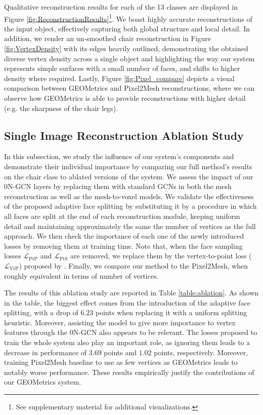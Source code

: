 \documentclass{article}
\begin{document}
Qualitative reconstruction results for each of the 13 classes are displayed in Figure \ref{fig:ReconstructionResults}\footnote{See supplementary material for additional visualizations.}. We boast highly accurate reconstructions of the input object, effectively capturing both global structure and local detail. In addition, we render an un-smoothed chair reconstruction in Figure \ref{fig:VertexDensity} with its edges heavily outlined, demonstrating the obtained diverse vertex density across a single object and highlighting the way our system represents simple surfaces with a small number of faces, and shifts to higher density where required. Lastly, Figure \ref{fig:Pixel_compare} depicts a visual comparison between GEOMetrics and Pixel2Mesh reconstructions, where we can observe how GEOMetrics is able to provide reconstructions with higher detail (e.g. the sharpness of the chair legs). 


\subsection{Single Image Reconstruction Ablation Study}

In this subsection, we study the influence of our system's components and demonstrate their individual importance by comparing our full method's results on the chair class to ablated versions of the system. We assess the impact of our 0N-GCN layers by replacing them with standard GCNs \cite{GCN} in both the mesh reconstruction as well as the mesh-to-voxel models. We validate the effectiveness of the proposed adaptive face splitting by substituting it by a procedure in which all faces are split at the end of each reconstruction module, keeping uniform detail and maintaining approximately the same the number of vertices as the full approach. We then check the importance of each one of the newly introduced losses by removing them at training time. Note that, when the face sampling losses $\mathcal{L}_{\text{PtP}}$ and $\mathcal{L}_{\text{PtS}}$ are removed, we replace them by the vertex-to-point loss ($\mathcal{L}_{\text{VtP}}$) proposed by \citet{Pixel2Mesh}. Finally, we compare our method to the Pixel2Mesh, when roughly equivalent in terms of number of vertices.

The results of this ablation study are reported in Table \ref{table:ablation}. As shown in the table, the biggest effect comes from the introduction of the adaptive face splitting, with a drop of $6.23$ points when replacing it with a uniform splitting heuristic. Moreover, assisting the model to give more importance to vertex features through the 0N-GCN also appears to be relevant. The losses proposed to train the whole system also play an important role, as ignoring them leads to a decrease in performance of $3.69$ points and $1.02$ points, respectively. Moreover, training Pixel2Mesh baseline to use as few vertices as GEOMetrics leads to notably worse performance. These results empirically justify the contributions of our GEOMetrics system.
\end{document}
